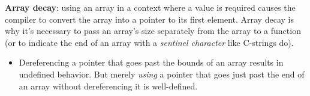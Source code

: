 \documentclass[7pt, twocolumn]{extarticle}
\newcommand{\myinline}[1]{\lstinline[basicstyle={\fontsize{5pt}{6}\ttfamily}]{#1}}
\begin{document}
\begin{small}


\textbf{Array decay}: using an array in a context where a value is required causes the compiler to convert the array into a pointer to its first element. Array decay is why it's necessary to pass an array's size separately from the array to a function (or to indicate the end of an array with a \textit{sentinel character} like C-strings do).

\begin{itemize}[leftmargin=*,align=parleft]
    \setlength\itemsep{0pt}
    \item[\textcolor{warning}{{\faWarning}}] Dereferencing a pointer that goes past the bounds of an array results in undefined behavior. But merely \textit{using} a pointer that goes just past the end of an array without dereferencing it is well-defined.
\end{itemize}


    

\end{small}
\end{document}
